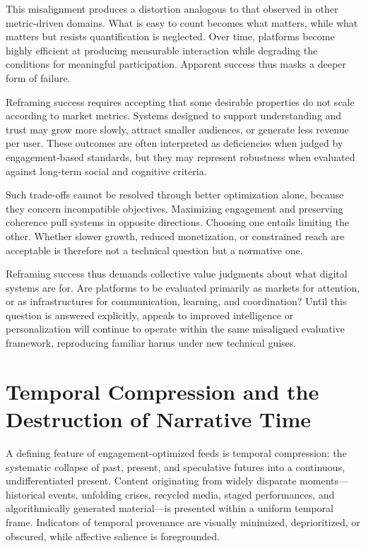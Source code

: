 \documentclass[12pt]{article}
\begin{document}
This misalignment produces a distortion analogous to that observed in other metric-driven domains. What is easy to count becomes what matters, while what matters but resists quantification is neglected. Over time, platforms become highly efficient at producing measurable interaction while degrading the conditions for meaningful participation. Apparent success thus masks a deeper form of failure.

Reframing success requires accepting that some desirable properties do not scale according to market metrics. Systems designed to support understanding and trust may grow more slowly, attract smaller audiences, or generate less revenue per user. These outcomes are often interpreted as deficiencies when judged by engagement-based standards, but they may represent robustness when evaluated against long-term social and cognitive criteria.

Such trade-offs cannot be resolved through better optimization alone, because they concern incompatible objectives. Maximizing engagement and preserving coherence pull systems in opposite directions. Choosing one entails limiting the other. Whether slower growth, reduced monetization, or constrained reach are acceptable is therefore not a technical question but a normative one.

Reframing success thus demands collective value judgments about what digital systems are for. Are platforms to be evaluated primarily as markets for attention, or as infrastructures for communication, learning, and coordination? Until this question is answered explicitly, appeals to improved intelligence or personalization will continue to operate within the same misaligned evaluative framework, reproducing familiar harms under new technical guises.

\section{Temporal Compression and the Destruction of Narrative Time}

A defining feature of engagement-optimized feeds is temporal compression: the systematic collapse of past, present, and speculative futures into a continuous, undifferentiated present. Content originating from widely disparate moments—historical events, unfolding crises, recycled media, staged performances, and algorithmically generated material—is presented within a uniform temporal frame. Indicators of temporal provenance are visually minimized, deprioritized, or obscured, while affective salience is foregrounded.
\end{document}
